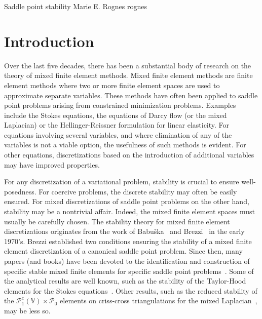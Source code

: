               {Saddle point stability}
              {Marie E. Rognes}
              {rognes}

\newcommand{\foralls}{\forall \;}
\newcommand{\Bi}{c}
\renewcommand{\VV}{W}
\newcommand{\triang}{\mathcal{T}}

\newcommand{\cg}{\mathcal{P}^c}
\newcommand{\dg}{\mathcal{P}}
\newcommand{\ascot}{\textsc{ascot}}
\newcommand{\pythonlang}{\projectfont{python}}

\renewcommand{\authornote}[1]{\noindent
  \begin{minipage}{\textwidth} \small\it
    \underline{\emph{Author note}}: #1
  \end{minipage}\normalsize \vspace{0.2cm}}

\section{Introduction}

Over the last five decades, there has been a substantial body of
research on the theory of mixed finite element methods.  Mixed finite
element methods are finite element methods where two or more finite
element spaces are used to approximate separate variables.  These
methods have often been applied to saddle point problems arising from
constrained minimization problems. Examples include the Stokes
equations, the equations of Darcy flow (or the mixed Laplacian) or the
Hellinger-Reissner formulation for linear elasticity.  For equations
involving several variables, and where elimination of any of the
variables is not a viable option, the usefulness of such methods is
evident. For other equations, discretizations based on the
introduction of additional variables may have improved properties.

For any discretization of a variational problem, stability is crucial
to ensure well-posedness. For coercive problems, the discrete
stability may often be easily ensured. For mixed discretizations of
saddle point problems on the other hand, stability may be a nontrivial
affair. Indeed, the mixed finite element spaces must usually be
carefully chosen. The stability theory for mixed finite element
discretizations originates from the work of Babu\v
ska~\cite{Babuska1973} and Brezzi~\cite{Brezzi1974} in the early
1970's. Brezzi established two conditions ensuring the stability of a
mixed finite element discretization of a canonical saddle point
problem.  Since then, many papers (and books) have been devoted to the
identification and construction of specific stable mixed finite
elements for specific saddle point
problems~\cite{ArnoldFalkWinther2006, BrezziDouglasMarini1985,
  BrezziFalk1991, BrezziFortin1991, RaviartThomas1977,
  TaylorHood1973}. Some of the analytical results are well known, such
as the stability of the Taylor-Hood elements for the Stokes
equations~\cite{BrezziFalk1991, TaylorHood1973}. Other results, such
as the reduced stability of the $\cg_1(\mathbb{V}) \times
\dg_0$ elements on criss-cross triangulations for the mixed
Laplacian~\cite{BoffiBrezziGastaldi1999}, may be less so.

